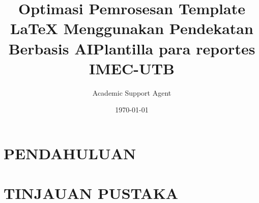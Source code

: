 \documentclass{article}
\title{Optimasi Pemrosesan Template LaTeX Menggunakan Pendekatan Berbasis AI}
\author{Academic Support Agent}
\date{\today}
\begin{document}
\maketitle

\begin{abstract}

\end{abstract}

\chapter{PENDAHULUAN}


\chapter{TINJAUAN PUSTAKA}



\title{Plantilla para reportes IMEC-UTB}
\usepackage[spanish]{babel} %
\usepackage[utf8]{inputenc} %
\usepackage{amsmath} %
\usepackage{amssymb} %
\usepackage{graphicx} %
\usepackage{color} %
\usepackage{subfigure} %
\usepackage{float} %
\usepackage{capt-of} %
\usepackage{sidecap} %
\usepackage{caption} %
\usepackage{commath} %
\usepackage{cancel} %
 
\usepackage{anysize} 					%
\marginsize{2cm}{2cm}{2cm}{2cm} %

\usepackage{appendix}
\renewcommand{\appendixname}{Apéndices}
\renewcommand{\appendixtocname}{Apéndices}
\renewcommand{\appendixpagename}{Apéndices} 

\usepackage[colorlinks=true,plainpages=true,citecolor=blue,linkcolor=blue]{hyperref}
\usepackage{fancyhdr} 
\pagestyle{fancy}
\fancyhf{}
\fancyfoot[C]{\thepage}  %
\renewcommand{\footrulewidth}{0.4pt}
\end{document}
